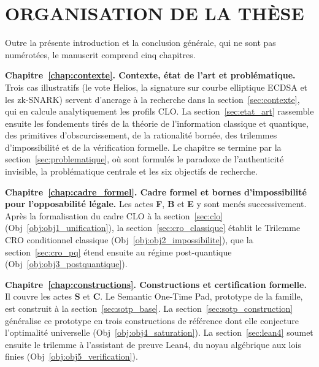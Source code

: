 \section{ORGANISATION DE LA TH\`ESE}
\label{sec:ig_organisation}
\begin{sloppypar}

Outre la pr\'esente introduction et la conclusion g\'en\'erale, qui ne sont
pas num\'erot\'ees, le manuscrit comprend cinq chapitres.

\textbf{Chapitre~\ref{chap:contexte}. Contexte, \'etat de l'art et probl\'ematique.}
Trois cas illustratifs (le vote Helios, la signature sur courbe elliptique ECDSA et les zk-SNARK) servent d'ancrage \`a la recherche
dans la section~\ref{sec:contexte}, qui en calcule analytiquement les profils CLO.
La section~\ref{sec:etat_art} rassemble ensuite les fondements tir\'es de la th\'eorie
de l'information classique et quantique, des primitives d'obscurcissement, de la
rationalit\'e born\'ee, des trilemmes d'impossibilit\'e et de la v\'erification formelle.
Le chapitre se termine par la section~\ref{sec:problematique}, o\`u sont formul\'es le
paradoxe de l'authenticit\'e invisible, la probl\'ematique centrale et les
six objectifs de recherche.

\textbf{Chapitre~\ref{chap:cadre_formel}. Cadre formel et bornes d'impossibilit\'e pour l'opposabilit\'e l\'egale.}
Les actes \textbf{F}, \textbf{B} et \textbf{E} y sont men\'es successivement.
Apr\`es la formalisation du cadre CLO \`a la section~\ref{sec:clo}
(Obj~\ref{obj:obj1_unification}), la section~\ref{sec:cro_classique}
\'etablit le Trilemme CRO conditionnel classique
(Obj~\ref{obj:obj2_impossibilite}), que la section~\ref{sec:cro_pq} \'etend ensuite au
r\'egime post-quantique (Obj~\ref{obj:obj3_postquantique}).

\textbf{Chapitre~\ref{chap:constructions}. Constructions et certification formelle.}
Il couvre les actes \textbf{S} et \textbf{C}. Le Semantic One-Time Pad, prototype de
la famille, est construit \`a la section~\ref{sec:sotp_base}. La section~\ref{sec:sotp_construction}
g\'en\'eralise ce prototype en trois constructions de r\'ef\'erence dont elle conjecture
l'optimalit\'e universelle (Obj~\ref{obj:obj4_saturation}). La section~\ref{sec:lean4}
soumet ensuite le trilemme \`a l'assistant de preuve Lean4, du noyau alg\'ebrique aux lois
finies (Obj~\ref{obj:obj5_verification}).


\end{sloppypar}
